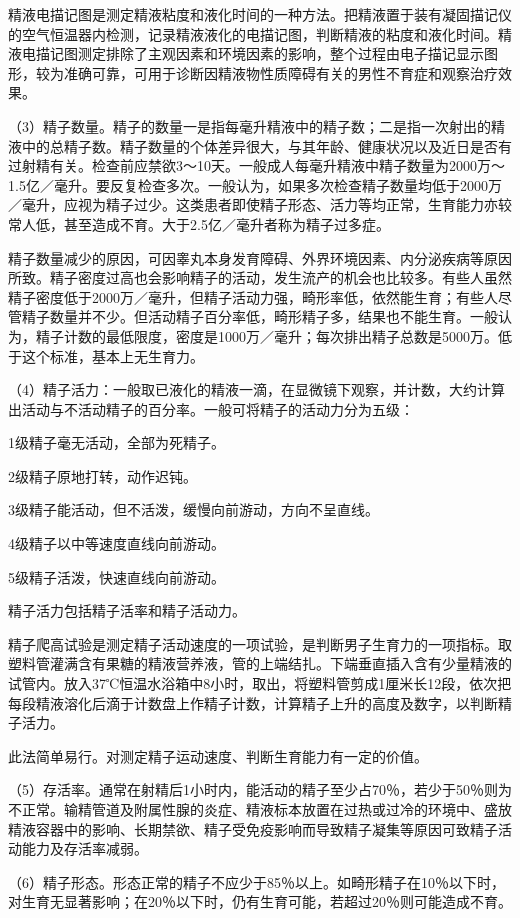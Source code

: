 \documentclass[12pt,UTF8,openany]{ctexbook}
\begin{document}
精液电描记图是测定精液粘度和液化时间的一种方法。把精液置于装有凝固描记仪的空气恒温器内检测，记录精液液化的电描记图，判断精液的粘度和液化时间。精液电描记图测定排除了主观因素和环境因素的影响，整个过程由电子描记显示图形，较为准确可靠，可用于诊断因精液物性质障碍有关的男性不育症和观察治疗效果。

（3）精子数量。精子的数量一是指每毫升精液中的精子数；二是指一次射出的精液中的总精子数。精子数量的个体差异很大，与其年龄、健康状况以及近日是否有过射精有关。检查前应禁欲3～10天。一般成人每毫升精液中精子数量为2000万～1.5亿／毫升。要反复检查多次。一般认为，如果多次检查精子数量均低于2000万／毫升，应视为精子过少。这类患者即使精子形态、活力等均正常，生育能力亦较常人低，甚至造成不育。大于2.5亿／毫升者称为精子过多症。

精子数量减少的原因，可因睾丸本身发育障碍、外界环境因素、内分泌疾病等原因所致。精子密度过高也会影响精子的活动，发生流产的机会也比较多。有些人虽然精子密度低于2000万／毫升，但精子活动力强，畸形率低，依然能生育；有些人尽管精子数量并不少。但活动精子百分率低，畸形精子多，结果也不能生育。一般认为，精子计数的最低限度，密度是1000万／毫升；每次排出精子总数是5000万。低于这个标准，基本上无生育力。

（4）精子活力：一般取已液化的精液一滴，在显微镜下观察，并计数，大约计算出活动与不活动精子的百分率。一般可将精子的活动力分为五级：

1级精子毫无活动，全部为死精子。

2级精子原地打转，动作迟钝。

3级精子能活动，但不活泼，缓慢向前游动，方向不呈直线。

4级精子以中等速度直线向前游动。

5级精子活泼，快速直线向前游动。

精子活力包括精子活率和精子活动力。

精子爬高试验是测定精子活动速度的一项试验，是判断男子生育力的一项指标。取塑料管灌满含有果糖的精液营养液，管的上端结扎。下端垂直插入含有少量精液的试管内。放入37℃恒温水浴箱中8小时，取出，将塑料管剪成1厘米长12段，依次把每段精液溶化后滴于计数盘上作精子计数，计算精子上升的高度及数字，以判断精子活力。

此法简单易行。对测定精子运动速度、判断生育能力有一定的价值。

（5）存活率。通常在射精后1小时内，能活动的精子至少占70％，若少于50％则为不正常。输精管道及附属性腺的炎症、精液标本放置在过热或过冷的环境中、盛放精液容器中的影响、长期禁欲、精子受免疫影响而导致精子凝集等原因可致精子活动能力及存活率减弱。

（6）精子形态。形态正常的精子不应少于85％以上。如畸形精子在10％以下时，对生育无显著影响；在20％以下时，仍有生育可能，若超过20％则可能造成不育。
\end{document}
